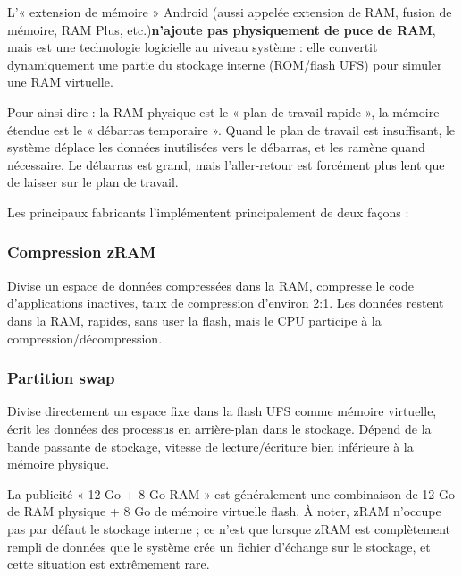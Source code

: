 


L'« extension de mémoire » Android (aussi appelée extension de RAM, fusion de mémoire, RAM Plus, etc.)\textbf{n'ajoute pas physiquement de puce de RAM}, mais est une technologie logicielle au niveau système : elle convertit dynamiquement une partie du stockage interne (ROM/flash UFS) pour simuler une RAM virtuelle.

Pour ainsi dire : la RAM physique est le « plan de travail rapide », la mémoire étendue est le « débarras temporaire ». Quand le plan de travail est insuffisant, le système déplace les données inutilisées vers le débarras, et les ramène quand nécessaire. Le débarras est grand, mais l'aller-retour est forcément plus lent que de laisser sur le plan de travail.


Les principaux fabricants l'implémentent principalement de deux façons :

\subsubsection*{Compression zRAM}

Divise un espace de données compressées dans la RAM, compresse le code d'applications inactives, taux de compression d'environ 2:1. Les données restent dans la RAM, rapides, sans user la flash, mais le CPU participe à la compression/décompression.

\subsubsection*{Partition swap}

Divise directement un espace fixe dans la flash UFS comme mémoire virtuelle, écrit les données des processus en arrière-plan dans le stockage. Dépend de la bande passante de stockage, vitesse de lecture/écriture bien inférieure à la mémoire physique.

La publicité « 12 Go + 8 Go RAM » est généralement une combinaison de 12 Go de RAM physique + 8 Go de mémoire virtuelle flash. À noter, zRAM n'occupe pas par défaut le stockage interne ; ce n'est que lorsque zRAM est complètement rempli de données que le système crée un fichier d'échange sur le stockage, et cette situation est extrêmement rare.

